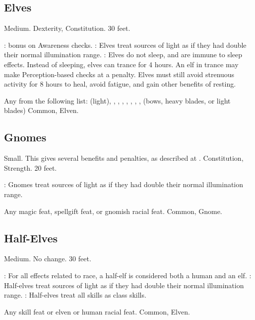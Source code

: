 \subsection{Elves}
 Medium.
  Dexterity,  Constitution.
 30 feet.
\begin{itemize}
    :  bonus on Awareness checks.
    : Elves treat sources of light as if they had double their normal illumination range.
    : Elves do not sleep, and are immune to sleep effects. Instead of sleeping, elves can trance for 4 hours. An elf in trance may make Perception-based checks at a  penalty. Elves must still avoid strenuous activity for 8 hours to heal, avoid fatigue, and gain other benefits of resting.
\end{itemize}
 Any from the following list:  (light), , , , , , , ,  (bows, heavy blades, or light blades)
 Common, Elven.

\subsection{Gnomes}
 Small. This gives several benefits and penalties, as described at .
  Constitution,  Strength.
 20 feet.
\begin{itemize}
    : Gnomes treat sources of light as if they had double their normal illumination range.
\end{itemize}
 Any magic feat, spellgift feat, or gnomish racial feat.
 Common, Gnome.

\subsection{Half-Elves}
 Medium.
 No change.
 30 feet.
\begin{itemize}
    : For all effects related to race, a half-elf is considered both a human and an elf.
    : Half-elves treat sources of light as if they had double their normal illumination range.
    : Half-elves treat all skills as class skills.
\end{itemize}
 Any skill feat or elven or human racial feat.
 Common, Elven.

